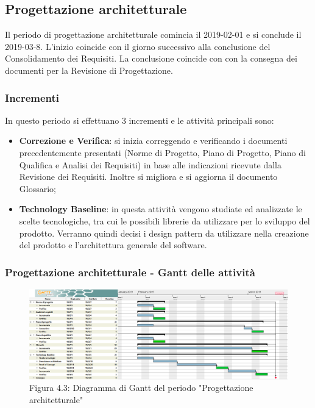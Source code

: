 \subsection{Progettazione architetturale}
Il periodo di progettazione architetturale comincia il 2019-02-01 e si conclude il 2019-03-8. L'inizio coincide con il giorno successivo alla conclusione del Consolidamento dei Requisiti. La conclusione coincide con con la consegna dei documenti per la Revisione di Progettazione. 
\subsubsection{Incrementi}
In questo periodo si effettuano 3 incrementi e le attività principali sono:
\begin{itemize}
	\item \textbf{Correzione e Verifica}: si inizia correggendo e verificando i documenti precedentemente presentati (Norme di Progetto, Piano di Progetto, Piano di Qualifica e Analisi dei Requisiti) in base alle indicazioni ricevute dalla Revisione dei Requisiti. Inoltre si migliora e si aggiorna il documento Glossario;
	\item \textbf{Technology Baseline}: in questa attività vengono studiate ed analizzate le scelte tecnologiche, tra cui le possibili librerie da utilizzare per lo sviluppo del prodotto. Verranno quindi decisi i design pattern da utilizzare nella creazione del prodotto e l'architettura generale del software.
\end{itemize}

\subsubsection{Progettazione architetturale - Gantt delle attività}

\begin{figure} [H]
	\centering
	\includegraphics[scale=0.3]{Res/Gantt/Progettazione}
	\caption{Figura 4.3: Diagramma di Gantt del periodo "Progettazione architetturale"}\label{}
\end{figure}

\pagebreak
